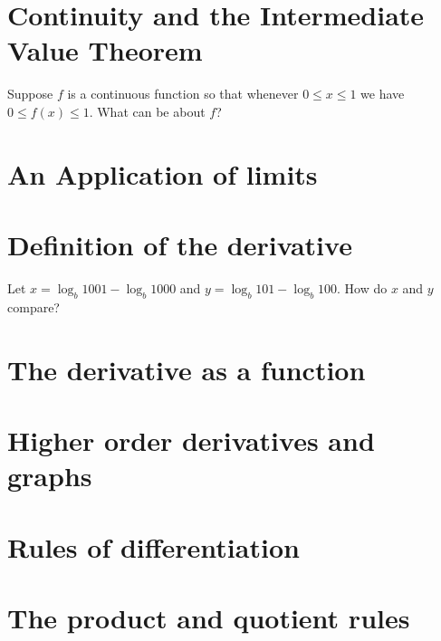 \documentclass{ximera}
\begin{document}
\section{Continuity and the Intermediate Value Theorem}

\begin{problem}
  Suppose $f$ is a continuous function so that whenever $0 \leq x \leq 1$ we have $0 \leq f(x) \leq 1$.  What can be about $f$?
  \begin{multipleChoice}
  \end{multipleChoice}
\end{problem}

\section{An Application of limits}
\section{Definition of the derivative}

\begin{problem}
  Let $x = \log_b 1001 - \log_b 1000$ and $y = \log_b 101 - \log_b 100$.  How do $x$ and $y$ compare?
  \begin{multipleChoice}
  \end{multipleChoice}
\end{problem}

\section{The derivative as a function}




\section{Higher order derivatives and graphs}
\section{Rules of differentiation}
\section{The product and quotient rules}
\end{document}
